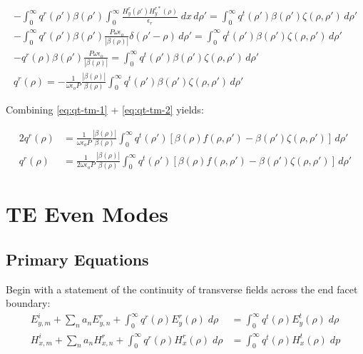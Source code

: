 \documentclass[11pt, oneside]{article}   	%
\begin{document}
\begin{align}
-\int_{0}^{\infty} q^{r}(\rho ') \beta(\rho ') \int_{0}^{\infty} \frac{H_{y}^{r}(\rho ') H_{y}^{r*}(\rho)}{\epsilon_{r}} \; dx \, d\rho '= \int_{0}^{\infty} q^{t} (\rho ') \beta(\rho ') \zeta(\rho, \rho ') \, d\rho ' \nonumber \\
-\int_{0}^{\infty} q^{r}(\rho ') \beta(\rho ') \frac{P \omega \epsilon_{o}}{|\beta(\rho)|}\delta(\rho '-\rho) \, d\rho '
= \int_{0}^{\infty} q^{t} (\rho ') \beta(\rho ') \zeta(\rho, \rho ') \, d\rho ' \nonumber \\
-q^{r}(\rho ) \beta(\rho ') \frac{P \omega \epsilon_{o}}{|\beta(\rho)|} = \int_{0}^{\infty} q^{t} (\rho ') \beta(\rho ')  \zeta(\rho, \rho ') \, d\rho ' \nonumber \\
q^{r}(\rho ) = -\frac{1}{\omega \epsilon_{o} P} \frac{|\beta(\rho)|}{\beta(\rho)}\int_{0}^{\infty} q^{t} (\rho ') \beta(\rho ') \zeta(\rho, \rho ') \, d\rho '
\label{eq:qt-tm-2}
\end{align}

Combining \eqref{eq:qt-tm-1} + \eqref{eq:qt-tm-2} yields:

\begin{align}
2 q^{r}(\rho ) &= \frac{1}{\omega \epsilon_{o} P} \frac{|\beta(\rho)|}{\beta(\rho)}\int_{0}^{\infty} q^{t} (\rho ') [\beta(\rho) f(\rho, \rho ') - \beta(\rho ') \zeta(\rho, \rho ')] \, d\rho ' \nonumber \\
q^{r}(\rho ) &= \frac{1}{2 \omega \epsilon_{o} P} \frac{|\beta(\rho)|}{\beta(\rho)}\int_{0}^{\infty} q^{t} (\rho ') [\beta(\rho) f(\rho, \rho ') - \beta(\rho ') \zeta(\rho, \rho ')] \, d\rho '
\end{align}


\newpage
\section{TE Even Modes}
\subsection{Primary Equations}

Begin with a statement of the continuity of transverse fields across the end facet boundary:
\begin{align}
E_{y,m}^{i} + \sum_{n} a_{n} E_{y,n}^{r} + \int_{0}^{\infty} q^{r}(\rho) E_{y}^{r}(\rho) \; d\rho &= \int_{0}^{\infty} q^{t} (\rho) E_{y}^{t} (\rho) \; d\rho \\
H_{x,m}^{i} + \sum_{n} a_{n} H_{x,n}^{r} + \int_{0}^{\infty} q^{r}(\rho) H_{x}^{r}(\rho) \; d\rho &= \int_{0}^{\infty} q^{t} (\rho) H_{x}^{t} (\rho) \; dp \label{eq:hx-continuity}
\end{align}
\end{document}
